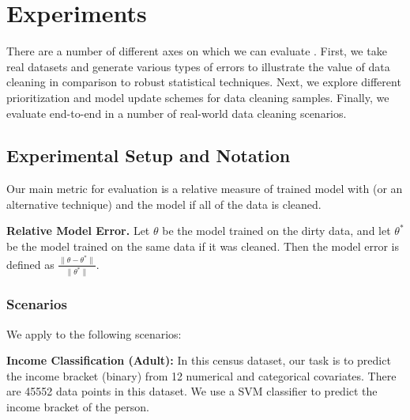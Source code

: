 \section{Experiments}
There are a number of different axes on which we can evaluate \sys.
First, we take real datasets and generate various types of errors to illustrate the value of data cleaning in comparison to robust statistical techniques.
Next, we explore different prioritization and model update schemes for data cleaning samples.
Finally, we evaluate \sys end-to-end in a number of real-world data cleaning scenarios.

\subsection{Experimental Setup and Notation}
Our main metric for evaluation is a relative measure of trained model with \sys (or an alternative technique) and the model if all of the data is cleaned.

\vspace{0.25em}

\noindent\textbf{Relative Model Error. } Let $\theta$ be the model trained on the dirty data, and let $\theta^*$ be the model trained on the same data if it was cleaned. Then the model error is defined as $\frac{\|\theta - \theta^*\|}{\|\theta^*\|}$.

\subsubsection{Scenarios}
\noindent We apply \sys to the following scenarios:



\vspace{0.25em}

\noindent\textbf{Income Classification (Adult): } In this census dataset, our task is to predict the income bracket (binary) from 12 numerical and categorical covariates. There are 45552 data points in this dataset. We use a SVM classifier to predict the income bracket of the person.

\vspace{0.25em}

